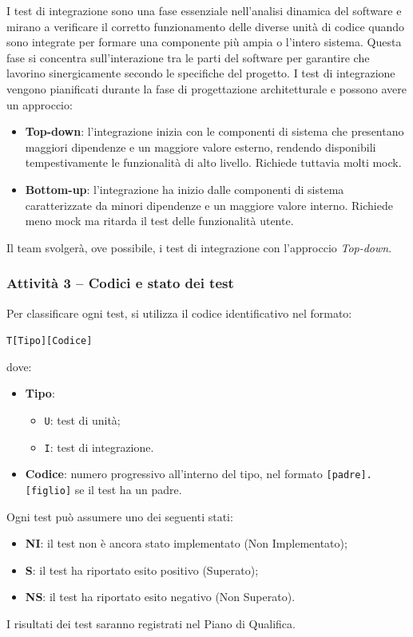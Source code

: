 \documentclass[a4paper, 11pt, oneside]{scrartcl}
\begin{document}
I test di integrazione sono una fase essenziale nell'analisi dinamica del software{\scriptsize{}} e mirano a verificare il corretto funzionamento delle diverse unità di codice quando sono integrate per formare una componente più ampia o l'intero sistema{\scriptsize{}}.
Questa fase si concentra sull'interazione tra le parti del software per garantire che lavorino sinergicamente secondo le specifiche del progetto.
I test di integrazione vengono pianificati durante la fase di progettazione architetturale e possono avere un approccio:
\begin{itemize}
    \item \textbf{Top-down}: l'integrazione inizia con le componenti di sistema che presentano maggiori dipendenze e un maggiore valore esterno, rendendo disponibili tempestivamente le funzionalità di alto livello. Richiede tuttavia molti mock.
    \item \textbf{Bottom-up}: l'integrazione ha inizio dalle componenti di sistema caratterizzate da minori dipendenze e un maggiore valore interno. Richiede meno mock ma ritarda il test delle funzionalità utente.
\end{itemize}
Il team svolgerà, ove possibile, i test di integrazione con l'approccio \emph{Top-down}.

\subsubsection{Attività 3 -- Codici e stato dei test}

Per classificare ogni test, si utilizza il codice identificativo nel formato:
\begin{center}
    \texttt{T[Tipo][Codice]}
\end{center}
dove:
\begin{itemize}
    \item \textbf{Tipo}:
    \begin{itemize}
        \item \texttt{U}: test di unità;
        \item \texttt{I}: test di integrazione.
    \end{itemize}
    \item \textbf{Codice}: numero progressivo all'interno del tipo, nel formato \texttt{[padre].[figlio]} se il test ha un padre.
\end{itemize}

Ogni test può assumere uno dei seguenti stati:
\begin{itemize}
    \item \textbf{NI}: il test non è ancora stato implementato (Non Implementato);
    \item \textbf{S}: il test ha riportato esito positivo (Superato);
    \item \textbf{NS}: il test ha riportato esito negativo (Non Superato).
\end{itemize}
I risultati dei test saranno registrati nel Piano di Qualifica{\scriptsize{}}.
\end{document}
